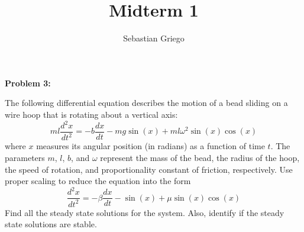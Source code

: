\documentclass[12pt]{article}
\newenvironment{problem}[1]{
    \textbf{Problem #1:}
}{
    \rmfamily \vspace{1em}
}
\begin{document}
\title{Midterm 1}  %
\author{Sebastian Griego}  %

\begin{problem}{3}
  The following differential equation describes the motion of a bead sliding on a wire hoop that is rotating about a vertical axis:
  \[
  ml\frac{d^2x}{dt^2} = -b\frac{dx}{dt} - mg\sin(x) + ml \omega^2 \sin(x) \cos(x)
  \]
  where \(x\) measures its angular position (in radians) as a function of time \(t\).
  The parameters \(m\), \(l\), \(b\), and \(\omega\) represent the mass of the bead, the radius of the hoop, the speed of rotation, and proportionality constant of friction, respectively. Use proper scaling to reduce the equation into the form
  \[
  \frac{d^2x}{dt^2} = -\beta \frac{dx}{dt} - \sin(x) + \mu \sin(x) \cos(x)
  \]
  Find all the steady state solutions for the system. Also, identify if the steady state solutions are stable.
\end{problem}
\end{document}
